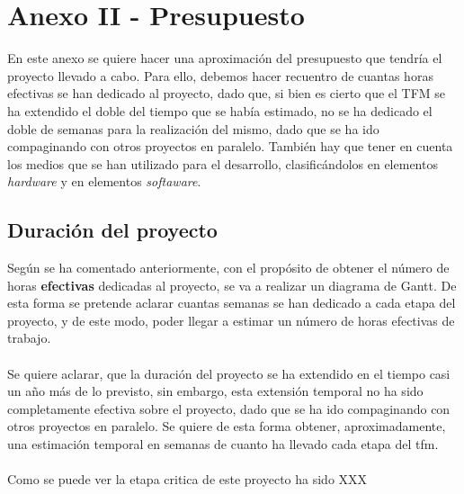 \chapter{Anexo II - Presupuesto}

En este anexo se quiere hacer una aproximación del presupuesto que tendría el proyecto llevado a cabo. Para ello, debemos hacer recuentro de cuantas horas efectivas se han dedicado al proyecto, dado que, si bien es cierto que el TFM se ha extendido el doble del tiempo que se había estimado, no se ha dedicado el doble de semanas para la realización del mismo, dado que se ha ido compaginando con otros proyectos en paralelo. También hay que tener en cuenta los medios que se han utilizado para el desarrollo, clasificándolos en elementos \textit{hardware} y en elementos \textit{softaware}.

\section{Duración del proyecto}


Según se ha comentado anteriormente, con el propósito de obtener el número de horas \textbf{efectivas} dedicadas al proyecto, se va a realizar un diagrama de Gantt. De esta forma se pretende aclarar cuantas semanas se han dedicado a cada etapa del proyecto, y de este modo, poder llegar a estimar un número de horas efectivas de trabajo.\\
\\
Se quiere aclarar, que la duración del proyecto se ha extendido en el tiempo casi un año más de lo previsto, sin embargo, esta extensión temporal no ha sido completamente efectiva sobre el proyecto, dado que se ha ido compaginando con otros proyectos en paralelo. Se quiere de esta forma obtener, aproximadamente, una estimación temporal en semanas de cuanto ha llevado cada etapa del \gls{tfm}.\\
\\
Como se puede ver la etapa critica de este proyecto ha sido XXX

